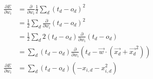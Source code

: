 \documentclass[preview]{standalone}
\begin{document}
\begin{align}
\begin{split}
\frac{\partial E}{\partial w_i}
&= \frac{\partial}{\partial w_i}\frac{1}{2}\sum_d(t_d-o_d)^2\\
&= \frac{1}{2}\sum_d\frac{\partial}{\partial w_i}(t_d-o_d)^2\\
&= \frac{1}{2}\sum_d2(t_d-o_d)\frac{\partial}{\partial w_i}(t_d-o_d)\\
&= \sum_d(t_d-o_d)\frac{\partial}{\partial w_i}(t_d-\vec{w}\cdot(\vec{x_d}+\vec{x_d}^2))\\
\frac{\partial E}{\partial w_i}
&= \sum_d(t_d-o_d)(-x_{i,d}-x_{i,d}^2)
\end{split}
\end{align}
\end{document}
